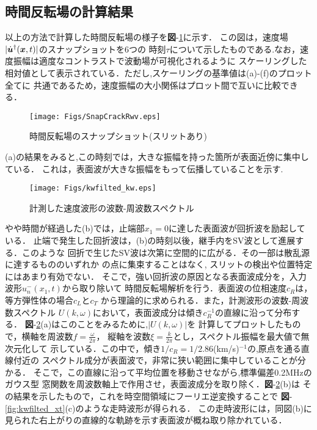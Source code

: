 \subsection{時間反転場の計算結果}
以上の方法で計算した時間反転場の様子を{\bf 図}-\ref{fig:snap_crack_rwv}に示す．
この図は，速度場$| \dot{\boldsymbol{u}}^{\dagger}(\boldsymbol{x},t)|$のスナップショットを6つの
時刻$\tau$について示したものである.なお，速度振幅は適度なコントラストで波動場が可視化されるように
スケーリングした相対値として表示されている．ただし,スケーリングの基準値は(a)-(f)のプロット全てに
共通であるため，速度振幅の大小関係はプロット間で互いに比較できる．
\begin{figure}[bth]
\centering
	\texttt{[image: Figs/SnapCrackRwv.eps]}
	\caption{時間反転場のスナップショット(スリットあり)}
	\label{fig:snap_crack_rwv}
\end{figure}
(a)の結果をみると,この時刻では，大きな振幅を持った箇所が表面近傍に集中している．
これは，表面波が大きな振幅をもって伝播していることを示す.
\begin{figure}[t]
\centering
	\texttt{[image: Figs/kwfilted\_kw.eps]}
	\caption{計測した速度波形の波数-周波数スペクトル}
	\label{fig:kwfilted_kw}
\end{figure}
やや時間が経過した(b)では，止端部$x_1=0$に達した表面波が回折波を励起している．
止端で発生した回折波は，(b)の時刻以後，継手内をSV波として進展する．このような
回折で生じたSV波は次第に空間的に広がる．その一部は散乱源に達するもののいずれか
の点に集束することはなく, スリットの検出や位置特定にはあまり有効でない．
%
そこで，強い回折波の原因となる表面波成分を，入力波形$u_n^{-}(x_1,t)$から取り除いて
時間反転場解析を行う．表面波の位相速度$c_R$は，等方弾性体の場合$c_L$と$c_T$
から理論的に求められる\cite{Schmerr1999}．また，計測波形の波数-周波数スペクトル
$U(k,\omega)$において，表面波成分は傾き$c_R^{-1}$の直線に沿って分布する．
{\bf 図}-\ref{fig:kwfilted_kw}(a)はこのことをみるために,$|U(k,\omega)|$を
計算してプロットしたもので，横軸を周波数$f=\frac{\omega}{2\pi}$，
縦軸を波数$\xi=\frac{k}{2\pi}$とし，スペクトル振幅を最大値で無次元化して
示している．この中で，傾き$1/c_R=1/2.86$(km/s)$^{-1}$の,原点を通る直線付近の
スペクトル成分が表面波で，非常に狭い範囲に集中していることが分かる．
そこで，この直線に沿って平均位置を移動させながら,標準偏差0.2MHzのガウス型
窓関数を周波数軸上で作用させ，表面波成分を取り除く．{\bf 図}-\ref{fig:kwfilted_kw}(b)は
その結果を示したもので，これを時空間領域にフーリエ逆変換することで
{\bf 図}-\ref{fig:kwfilted_xt}(c)のような走時波形が得られる．
この走時波形には，同図(b)に見られた右上がりの直線的な軌跡を示す表面波が概ね取り除かれている．
